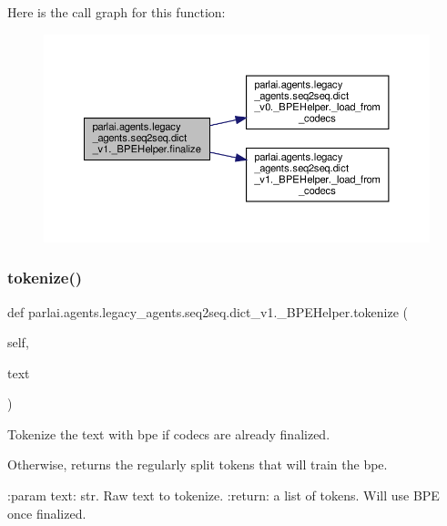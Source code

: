 Here is the call graph for this function\+:
\nopagebreak
\begin{figure}[H]
\begin{center}
\leavevmode
\includegraphics[width=350pt]{classparlai_1_1agents_1_1legacy__agents_1_1seq2seq_1_1dict__v1_1_1__BPEHelper_a90568a5897058075adae4b066693c0cc_cgraph}
\end{center}
\end{figure}
\mbox{\label{classparlai_1_1agents_1_1legacy__agents_1_1seq2seq_1_1dict__v1_1_1__BPEHelper_a4123dd721a13dc6607498ae29d7dd8a3}} 
\subsubsection{\texorpdfstring{tokenize()}{tokenize()}}
{\footnotesize\ttfamily def parlai.\+agents.\+legacy\+\_\+agents.\+seq2seq.\+dict\+\_\+v1.\+\_\+\+B\+P\+E\+Helper.\+tokenize (\begin{DoxyParamCaption}\item[{}]{self,  }\item[{}]{text }\end{DoxyParamCaption})}

\begin{DoxyVerb}Tokenize the text with bpe if codecs are already finalized.

Otherwise, returns the regularly split tokens that will train the bpe.

:param text: str. Raw text to tokenize.
:return: a list of tokens. Will use BPE once finalized.
\end{DoxyVerb}
 

